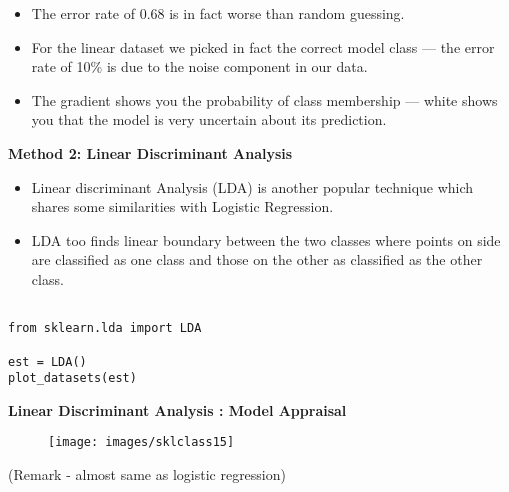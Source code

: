 \documentclass[SKL-MASTER.tex]{subfiles}
\begin{document}
	\begin{itemize}
		
		\item The error rate of 0.68 is in fact worse than random guessing. \item For the linear dataset we picked in fact the correct model class — the error rate of 10\% is due to the noise component in our data. 
\item The gradient shows you the probability of class membership — white shows you that the model is very uncertain about its prediction.
\end{itemize}


\newpage
\textbf{Method 2: Linear Discriminant Analysis}
\begin{itemize}
\item Linear discriminant Analysis (LDA) is another popular technique which shares some similarities with Logistic Regression. 
\item LDA too finds linear boundary between the two classes where points on side are classified as one class and those on the other as classified as the other class.
\end{itemize}


\begin{framed}
\begin{verbatim}

from sklearn.lda import LDA

est = LDA()
plot_datasets(est)
\end{verbatim}
\end{framed}
\newpage
\noindent \textbf{Linear Discriminant Analysis : Model Appraisal}
\begin{figure}[h!]
\centering
\texttt{[image: images/sklclass15]}

\end{figure}
(Remark - almost same as logistic regression)
\end{document}
